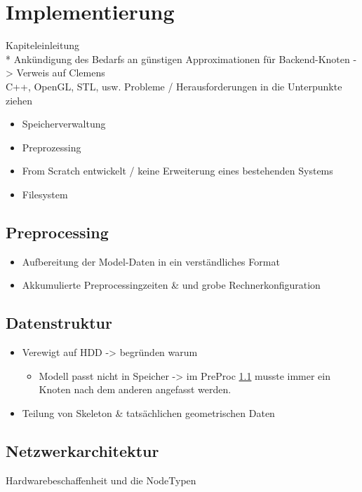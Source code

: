 
\chapter{Implementierung}
\label{chap:impl}
Kapiteleinleitung\\*
Ankündigung des Bedarfs an günstigen Approximationen für Backend-Knoten -> Verweis auf Clemens\\
C++, OpenGL, STL, usw.
Probleme / Herausforderungen in die Unterpunkte ziehen
\begin{itemize}
 \item Speicherverwaltung
 \item Preprozessing
 \item From Scratch entwickelt / keine Erweiterung eines bestehenden Systems
 \item Filesystem
\end{itemize}

\section{Preprocessing}
\label{sec:impl:preprocessing}
%
\begin{itemize}
 \item Aufbereitung der Model-Daten in ein verständliches Format
 \item Akkumulierte Preprocessingzeiten \& und grobe Rechnerkonfiguration
\end{itemize}

\section{Datenstruktur}
\label{sec:impl:datenstruktur}
%
\begin{itemize}
 \item Verewigt auf HDD -> begründen warum
 \begin{itemize}
  \item Modell passt nicht in Speicher -> im PreProc \ref{sec:impl:preprocessing} musste immer ein Knoten nach dem anderen angefasst werden.
 \end{itemize}

 \item Teilung von Skeleton \& tatsächlichen geometrischen Daten
\end{itemize}



\section{Netzwerkarchitektur}
\label{sec:impl:netzwerkarchitektur}
%
Hardwarebeschaffenheit und die NodeTypen

